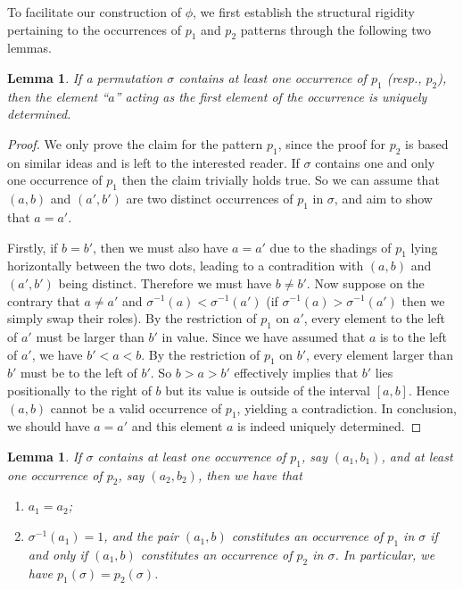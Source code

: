 \documentclass[12pt]{article}
\newtheorem{lem}[thm]{Lemma}
\begin{document}
To facilitate our construction of $\phi$, we first establish the structural rigidity pertaining to the occurrences of $p_1$ and $p_2$ patterns through the following two lemmas.
\begin{lem}\label{lem:unique-a}
  If a permutation $\sigma$ contains at least one occurrence of $p_1$ (resp., $p_2$), then the element ``$a$'' acting as the first element of the occurrence is uniquely determined.
\end{lem}
\begin{proof}
We only prove the claim for the pattern $p_1$, since the proof for $p_2$ is based on similar ideas and is left to the interested reader. If $\sigma$ contains one and only one occurrence of $p_1$ then the claim trivially holds true. So we can assume that $(a, b)$ and $(a', b')$ are two distinct occurrences of $p_1$ in $\sigma$, and aim to show that $a=a'$.

Firstly, if $b=b'$, then we must also have $a=a'$ due to the shadings of $p_1$ lying horizontally between the two dots, leading to a contradition with $(a, b)$ and $(a', b')$ being distinct. Therefore we must have $b\neq b'$. Now suppose on the contrary that $a\neq a'$ and $\sigma^{-1}(a)<\sigma^{-1}(a')$ (if $\sigma^{-1}(a)>\sigma^{-1}(a')$ then we simply swap their roles). By the restriction of $p_1$ on $a'$, every element to the left of $a'$ must be larger than $b'$ in value. Since we have assumed that $a$ is to the left of $a'$, we have $b' < a < b$. By the restriction of $p_1$ on $b'$, every element larger than $b'$ must be to the left of $b'$. So $b>a>b'$ effectively implies that $b'$ lies positionally to the right of $b$ but its value is outside of the interval $[a,b]$. Hence $(a,b)$ cannot be a valid occurrence of $p_1$, yielding a contradiction. In conclusion, we should have $a=a'$ and this element $a$ is indeed uniquely determined.
\end{proof}

\begin{lem}\label{lem:same-a}
  If $\sigma$ contains at least one occurrence of $p_1$, say $(a_1, b_1)$, and at least one occurrence of $p_2$, say $(a_2, b_2)$, then we have that
  \begin{enumerate}[label=(\arabic*)]
    \item $a_1 = a_2$;
    \item $\sigma^{-1}(a_1)=1$, and the pair $(a_1,b)$ constitutes an occurrence of $p_1$ in $\sigma$ if and only if $(a_1,b)$ constitutes an occurrence of $p_2$ in $\sigma$. In particular, we have $p_1(\sigma)=p_2(\sigma)$.
  \end{enumerate}
\end{lem}
\end{document}
